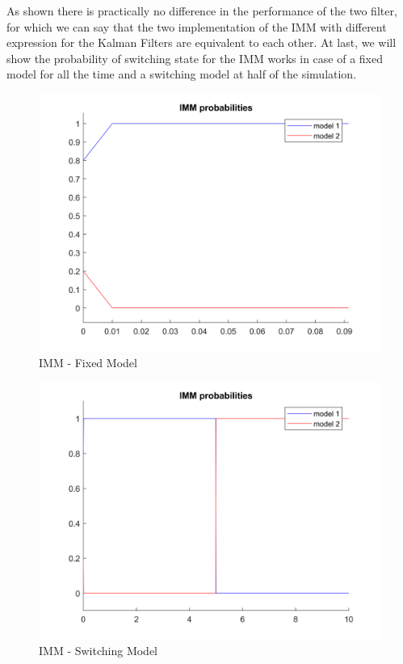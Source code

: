 \documentclass[conference]{IEEEtran}
\begin{document}
As shown there is practically no difference in the performance of the two filter, for which we can say that the two implementation of the IMM with different expression for the Kalman Filters are equivalent to each other.
At last, we will show the probability of switching state for the IMM works in case of a fixed model for all the time and a switching model at half of the simulation.
\begin{figure}[H]
 \includegraphics[width=\linewidth]{dwg/mu1.png}
  \caption{IMM - Fixed Model}
\end{figure}
\begin{figure}[H]
 \includegraphics[width=\linewidth]{dwg/mu2.png}
  \caption{IMM - Switching Model}
\end{figure}
\end{document}
